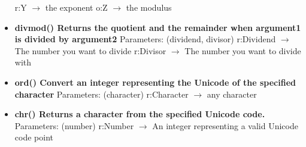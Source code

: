 \documentclass{report}
\begin{document}
\begin{itemize}
          \smallbreak \noindent
          r:Y $\rightarrow$ the exponent
          \smallbreak \noindent
          o:Z $\rightarrow$ the modulus 
          \smallbreak \noindent
        \item[\ding{43}] \textbf{divmod()	Returns the quotient and the remainder when argument1 is divided by argument2}
          \smallbreak \noindent
          Parameters: (dividend, divisor)
          \smallbreak \noindent
          r:Dividend $\rightarrow$ The number you want to divide
          \smallbreak \noindent
          r:Divisor $\rightarrow$ The number you want to divide with
          \smallbreak \noindent
        \item[\ding{43}] \textbf{ord()	Convert an integer representing the Unicode of the specified character}
          \smallbreak \noindent
          Parameters: (character)
          \smallbreak \noindent
          r:Character $\rightarrow$ any character
          \smallbreak \noindent
        \item[\ding{43}] \textbf{chr()	Returns a character from the specified Unicode code.}
          \smallbreak \noindent
          Parameters: (number)
          \smallbreak \noindent
          r:Number $\rightarrow$ 	An integer representing a valid Unicode code point
          \smallbreak \noindent
      \end{itemize}
    

    \bigbreak \noindent 
    
\end{document}
